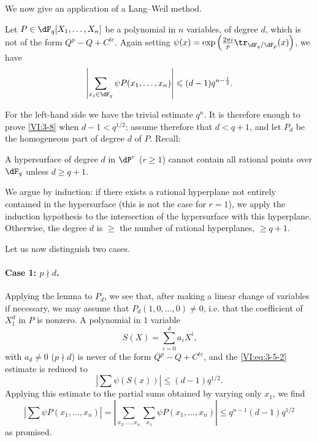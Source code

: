 We now give an application of a Lang--Weil method. 





\begin{proposition_}\label{VI:3-8}
Let $P\in \dF_q[X_1,\dots,X_n]$ be a polynomial in $n$ variables, of degree 
$d$, which is not of the form $Q^p-Q+C^{te}$. Again setting 
$\psi(x) = \exp\left(\frac{2\pi i}{p} \tr_{\dF_q/\dF_p}(x)\right)$, we have 
\[
  \left|\sum_{x_i\in \dF_q} \psi P(x_1,\dots,x_n)\right| \leqslant (d-1) q^{n-\frac 1 2} \text{.}
\]
\end{proposition_}

For the left-hand side we have the trivial estimate $q^n$. It is therefore enough to 
prove \ref{VI:3-8} when $d-1<q^{1/2}$; assume therefore that 
$d<q+1$, and let $P_d$ be the homogeneous part of degree $d$ of $P$. Recall: 





\begin{lemma_}\label{VI:3-9}
A hypersurface of degree $d$ in $\dP^r$ ($r\geqslant 1$) cannot contain 
all rational points over $\dF_q$ unless $d\geqslant q+1$. 
\end{lemma_}

We argue by induction: if there exists a rational hyperplane not 
entirely contained in the hypersurface (this is not the case for $r=1$), we 
apply the induction hypothesis to the intersection of the hypersurface with this 
hyperplane. Otherwise, the degree $d$ is $\geqslant$ the number of rational 
hyperplanes, $\geqslant q+1$. 

Let us now distinguish two cases. 


\paragraph{Case 1: $p\nmid d$.}
Applying the lemma to $P_d$, we see that, after making a linear change 
of variables if necessary, we may assume that $P_d(1,0,\ldots,0)\ne 0$, i.e. 
that the coefficient of $X_1^d$ in $P$ is nonzero. A polynomial in $1$ 
variable 
\[
  S(X) = \sum_{i=0}^d a_i X^i \text{,} 
\]
with $a_d\ne 0$ ($p\nmid d$) is never of the form $Q^p-Q+C^{t e}$, and 
the \eqref{VI:eq:3-5-2} estimate is reduced to 
\[
  \left| \sum \psi(S(x)) \right| \leqslant (d-1) q^{1/2} \text{.} 
\]
Applying this estimate to the partial sums obtained by varying 
only $x_1$, we find 
\[
  \left| \sum \psi P(x_1,\dots,x_n) \right| = \left| \sum_{x_2,\dots,x_n} \sum_{x_1} \psi P(x_1,\dots,x_n)\right| \leqslant q^{n-1} (d-1) q^{1/2} 
\]
as promised. 


